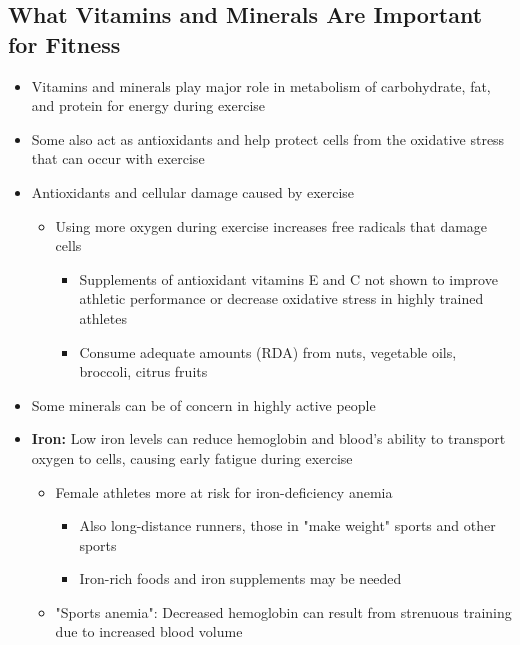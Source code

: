 \documentclass[12pt]{article}
\begin{document}
        \subsection{What Vitamins and Minerals Are Important for Fitness}
            \begin{itemize}
                \item Vitamins and minerals play major role in metabolism of carbohydrate, fat, and protein for energy during exercise
                \item Some also act as antioxidants and help protect cells from the oxidative stress that can occur with exercise
                \item Antioxidants and cellular damage caused by exercise
                    \begin{itemize}
                        \item Using more oxygen during exercise increases free radicals that damage cells
                            \begin{itemize}
                                \item Supplements of antioxidant vitamins E and C not shown to improve athletic performance or decrease oxidative stress in highly trained athletes
                                \item Consume adequate amounts (RDA) from nuts, vegetable oils, broccoli, citrus fruits
                            \end{itemize}
                    \end{itemize}
                \item Some minerals can be of concern in highly active people
                \item \textbf{Iron:} Low iron levels can reduce hemoglobin and blood's ability to transport oxygen to cells, causing early fatigue during exercise
                    \begin{itemize}
                        \item Female athletes more at risk for iron-deficiency anemia
                            \begin{itemize}
                                \item Also long-distance runners, those in "make weight" sports and other sports
                                \item Iron-rich foods and iron supplements may be needed
                            \end{itemize}
                        \item "Sports anemia": Decreased hemoglobin can result from strenuous training due to increased blood volume

\end{itemize}
\end{itemize}
\end{document}

